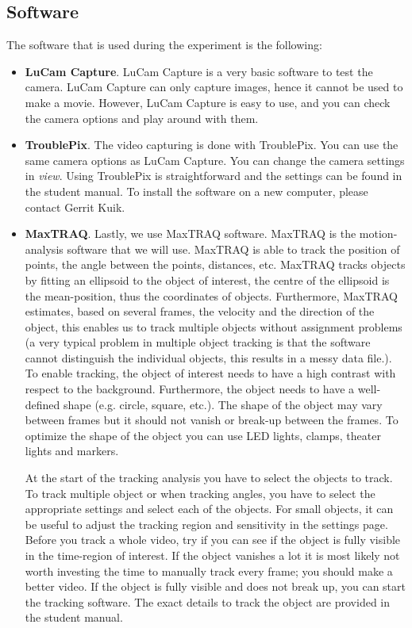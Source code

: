 \documentclass{article}
\begin{document}
\subsection{Software}
The software that is used during the experiment is the following:
\begin{itemize}
\item \textbf{LuCam Capture}. LuCam Capture is a very basic software to test the camera. LuCam Capture can only capture images, hence it cannot be used to make a movie. However, LuCam Capture is easy to use, and you can check the camera options and play around with them.
\item \textbf{TroublePix}. The video capturing is done with TroublePix. You can use the same camera options as LuCam Capture. You can change the camera settings in \emph{view}. Using TroublePix is straightforward and the settings can be found in the student manual.
To install the software on a new computer, please contact Gerrit Kuik. 
\item \textbf{MaxTRAQ}. Lastly, we use MaxTRAQ software. MaxTRAQ is the motion-analysis software that we will use. MaxTRAQ is able to track the position of points, the angle between the points, distances, etc. MaxTRAQ tracks objects by fitting an ellipsoid to the object of interest, the centre of the ellipsoid is the mean-position, thus the coordinates of objects. Furthermore, MaxTRAQ estimates, based on several frames, the velocity and the direction of the object, this enables us to track multiple objects without assignment problems (a very typical problem in multiple object tracking is that the software cannot distinguish the individual objects, this results in a messy data file.). To enable tracking, the object of interest needs to have a high contrast with respect to the background. Furthermore, the object needs to have a well-defined shape (e.g. circle, square, etc.). The shape of the object may vary between frames but it should not vanish or break-up between the frames. To optimize the shape of the object you can use LED lights, clamps, theater lights and markers.

At the start of the tracking analysis you have to select the objects to track. To track multiple object or when tracking angles, you have to select the appropriate settings and select each of the objects. For small objects, it can be useful to adjust the tracking region and sensitivity in the settings page. Before you track a whole video, try if you can see if the object is fully visible in the time-region of interest. If the object vanishes a lot it is most likely not worth investing the time to manually track every frame; you should make a better video. If the object is fully visible and does not break up, you can start the tracking software. The exact details to track the object are provided in the student manual. 


\end{itemize}
\end{document}
